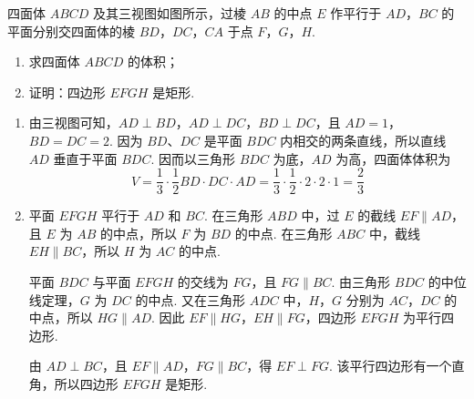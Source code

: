 \begin{problem}
四面体 \(ABCD\) 及其三视图如图所示，过棱 \(AB\) 的中点 \(E\) 作平行于 \(AD\)，\(BC\) 的平面分别交四面体的棱 \(BD\)，\(DC\)，\(CA\) 于点 \(F\)，\(G\)，\(H\).
\begin{enumerate}
\item 求四面体 \(ABCD\) 的体积；
\item 证明：四边形 \(EFGH\) 是矩形.
\end{enumerate}

\begin{solution}
\begin{enumerate}
\item 由三视图可知，\(AD\perp BD\)，\(AD\perp DC\)，\(BD\perp DC\)，且 \(AD=1\)，\(BD=DC=2\). 因为 \(BD\)、\(DC\) 是平面 \(BDC\) 内相交的两条直线，所以直线 \(AD\) 垂直于平面 \(BDC\). 因而以三角形 \(BDC\) 为底，\(AD\) 为高，四面体体积为
\[
V=\frac13\cdot\frac12BD\cdot DC\cdot AD
=\frac13\cdot\frac12\cdot2\cdot2\cdot1=\frac23
\]

\item 平面 \(EFGH\) 平行于 \(AD\) 和 \(BC\). 在三角形 \(ABD\) 中，过 \(E\) 的截线 \(EF\parallel AD\)，且 \(E\) 为 \(AB\) 的中点，所以 \(F\) 为 \(BD\) 的中点. 在三角形 \(ABC\) 中，截线 \(EH\parallel BC\)，所以 \(H\) 为 \(AC\) 的中点.

平面 \(BDC\) 与平面 \(EFGH\) 的交线为 \(FG\)，且 \(FG\parallel BC\). 由三角形 \(BDC\) 的中位线定理，\(G\) 为 \(DC\) 的中点. 又在三角形 \(ADC\) 中，\(H\)，\(G\) 分别为 \(AC\)，\(DC\) 的中点，所以 \(HG\parallel AD\). 因此 \(EF\parallel HG\)，\(EH\parallel FG\)，四边形 \(EFGH\) 为平行四边形.

由 \(AD\perp BC\)，且 \(EF\parallel AD\)，\(FG\parallel BC\)，得 \(EF\perp FG\). 该平行四边形有一个直角，所以四边形 \(EFGH\) 是矩形.
\end{enumerate}
\end{solution}
\end{problem}

